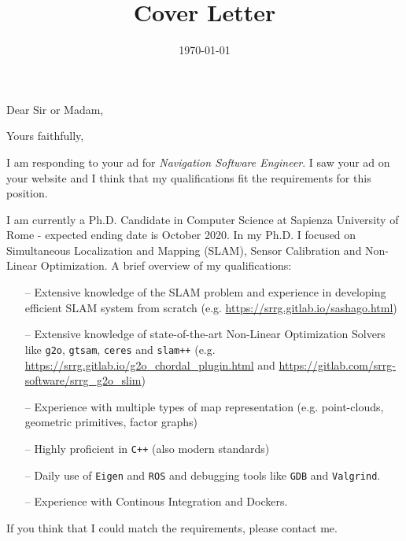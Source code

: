 \documentclass[11pt,a4paper,roman]{moderncv}
\title{Cover Letter}                               %
\begin{document}
\date{\today}
\opening{Dear Sir or Madam,}
\closing{Yours faithfully,}
\makelettertitle

I am responding to your ad for \emph{Navigation Software Engineer}.
I saw your ad on your website and I think that my qualifications
fit the requirements for this position.

I am currently a Ph.D. Candidate in Computer Science at Sapienza University of Rome -
expected ending date is October 2020.
In my Ph.D. I focused on Simultaneous Localization and Mapping (SLAM), Sensor Calibration and
Non-Linear Optimization. A brief overview of my qualifications:

\vspace{10pt}
\begin{itemize}
\item[--] Extensive knowledge of the SLAM problem and
  experience in developing efficient SLAM system from scratch
  (e.g. \url{https://srrg.gitlab.io/sashago.html})
\item[--] Extensive knowledge of state-of-the-art Non-Linear Optimization Solvers like \texttt{g2o}, \texttt{gtsam}, \texttt{ceres} and \texttt{slam++}
  (e.g. \url{https://srrg.gitlab.io/g2o_chordal_plugin.html} and
  \url{https://gitlab.com/srrg-software/srrg_g2o_slim})
\item[--] Experience with multiple types of map representation
  (e.g. point-clouds, geometric primitives, factor graphs)
\item[--] Highly proficient in \texttt{C++} (also modern standards)
\item[--] Daily use of \texttt{Eigen} and \texttt{ROS}
  and debugging tools like \texttt{GDB} and \texttt{Valgrind}.
\item[--] Experience with Continous Integration and Dockers.
\end{itemize}
\vspace{10pt}

If you think that I could match the requirements, please contact me.

\makeletterclosing
\end{document}
